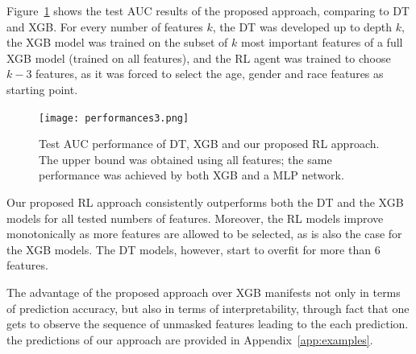 \documentclass[reqno,11pt]{article}
\begin{document}
Figure~\ref{fig:performance} shows the test AUC results of the proposed approach, comparing to DT and XGB. 
For every number of features $k$, the DT was developed up to depth $k$, the XGB model was trained on the subset of $k$ most important features of a full XGB model (trained on all features), and the RL agent was trained to choose $k-3$ features, as it was forced to select the age, gender and race features as starting point.
\begin{figure}[h!]
  \centering
   \texttt{[image: performances3.png]}  
    \caption{Test AUC performance of DT, XGB and our proposed RL approach. The upper bound was obtained using all features; the same performance was achieved by both XGB and a MLP network.}
    \label{fig:performance}
\end{figure}
Our proposed RL approach consistently outperforms both the DT and the XGB models for all tested numbers of features. 
Moreover, the RL models improve monotonically as more features are allowed to be selected, as is also the case for the XGB models. The DT models, however, start to overfit for more than 6 features.

The advantage of the proposed approach over XGB manifests not only in terms of prediction accuracy, but also in terms of interpretability, through fact that one gets to observe the sequence of unmasked features leading to the each prediction. 
the predictions of our approach are provided in Appendix~\ref{app:examples}.
\end{document}
